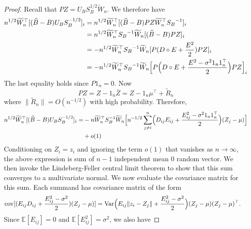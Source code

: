 \begin{proof}
 Recall that $PZ = U_B S_B^{1/2} \tilde{W}_n $. We therefore have
    \begin{align*}
        n^{1/2} \tilde{W}_n^\top [(\hat{B} - B) U_B S_B^{-1/2}]_{i}
        & = n^{1/2} \tilde{W}_n^\top [(\hat{B} - B) PZ \tilde{W}_n^\top {S_B}^{-1}]_{i} \\
        & = n^{1/2} \tilde{W}_n^\top {S_B}^{-1} \tilde{W}_n [(\hat{B} - B)PZ]_{i}\\
        & = - n^{1/2} \tilde{W}_n^\top {S_B}^{-1} \tilde{W}_n [P(D \circ E  + \frac{E^2}{2} )PZ]_{i}\\
        & = - n^{1/2} \tilde{W}_n^\top {S_B}^{-1} \tilde{W}_n \Bigl[ P \Bigl(D \circ E + \frac{E^2 - \sigma^2 1_n 1_n^{\top}}{2}\Bigr) P Z\Bigr]_{i}
    \end{align*}
The last equality holds since  $P 1_n = 0$. Now 
$$PZ = Z - 1_n \bar{Z} = Z - 1_n \mu^{\top} + \tilde{R}_n$$ where $\|\tilde{R}_n\| = O(n^{-1/2})$ with high probability.  
Therefore,
    \begin{equation*}
    \begin{split}
        n^{1/2} \tilde{W}_n^\top [(\hat{B} - B) U_B S_B^{-1/2}]_{i} 
         =& - n \tilde{W}_n^\top S_B^{-1} \tilde{W}_n \Bigl[n^{-1/2} \sum_{j \neq i}^{n} \Bigl(D_{ij} E_{ij} + \frac{E_{ij}^2 - \sigma^2 1_n 1_n^{\top}}{2} \Bigr) (Z_j - \mu)\Bigr] \\ &+ o(1) %
    \end{split}
    \end{equation*} 
Conditioning on $Z_i = z_i$ and ignoring the term $o(1)$ that vanishes as $n \rightarrow \infty$, the above expression is sum of $n-1$ independent mean $0$ random vector. We then invoke the Lindeberg-Feller central limit theorem to show that this sum converges to a multivariate normal. We now evaluate the covariance matrix for this sum. Each summand has covariance matrix of the form
\begin{align*}
\mathrm{cov}[(E_{ij} D_{ij} + \frac{E_{ij}^2 - \sigma^2}{2}) (Z_j - {\mu})]
& = \mathrm{Var}\Bigl(E_{ij} \|z_i - Z_j\| + \frac{E_{ij}^2 - \sigma^2}{2}\Bigr) (Z_j - {\mu}) (Z_j - {\mu})^\top.
\end{align*}
Since $\mathbb{E}[E_{ij}] = 0$ and $\mathbb{E}[E_{ij}^2] = \sigma^2$, we also have

\end{proof}
